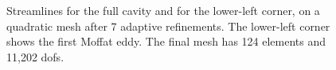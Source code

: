 \begin{figure}[h!b!p!]
\centering
{}
\caption{Streamlines for the full cavity and for the lower-left corner, on a quadratic mesh after 7 adaptive refinements.  The lower-left corner shows the first Moffat eddy.  The final mesh has 124 elements and 11,202 dofs.}
\label{fig:streamlines_p2}
\end{figure}

